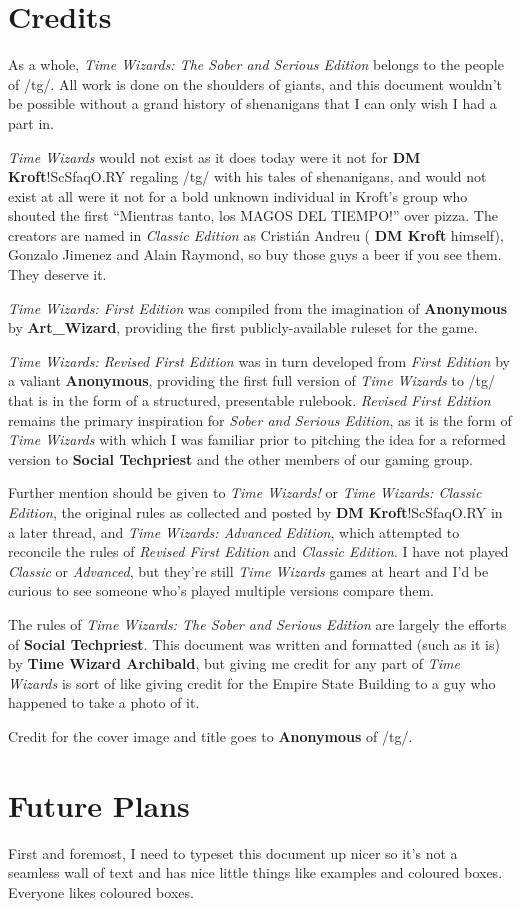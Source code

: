 \documentclass{article}
\newcommand{\twsse}{\emph{Time Wizards: The Sober and Serious Edition}}
\newcommand{\tw}{\emph{Time Wizards}}
\newcommand{\sse}{\emph{Sober and Serious Edition}}
\newcommand{\rfe}{\emph{Revised First Edition}}
\newcommand{\anon}[1][]{{\color{anongreen} \textbf{Anonymous}#1}}
\newcommand{\namefag}[2][]{{\color{anongreen} \textbf{#2}#1}}
\begin{document}
\section{Credits}
As a whole, \twsse{} belongs to the people of /tg/. All work is done on the shoulders of giants,
and this document wouldn't be possible without a grand history of shenanigans that I can only
wish I had a part in.

\tw{} would not exist as it does today were it not for \namefag[!ScSfaqO.RY]{DM Kroft} regaling
/tg/ with his tales of shenanigans, and would not exist at all were it not for a bold unknown
individual in Kroft's group who shouted the first ``Mientras tanto, los MAGOS DEL TIEMPO!'' over
pizza. The creators are named in \emph{Classic Edition} as Cristián Andreu (\namefag{DM Kroft}
himself), Gonzalo Jimenez and Alain Raymond, so buy those guys a beer if you see them. They
deserve it.

\emph{Time Wizards: First Edition} was compiled from the imagination of \anon{} by
\namefag{Art\_Wizard}, providing the first publicly-available ruleset for the game.

\emph{Time Wizards: Revised First Edition} was in turn developed from \emph{First Edition} by a
valiant \anon{}, providing the first full version of \tw{} to /tg/ that is in the form of a
structured, presentable rulebook. \rfe{} remains the primary inspiration for \sse{}, as it is the
form of \tw{} with which I was familiar prior to pitching the idea for a reformed version to
\namefag{Social Techpriest} and the other members of our gaming group.

Further mention should be given to \emph{Time Wizards!} or \emph{Time Wizards: Classic Edition},
the original rules as collected and posted by \namefag[!ScSfaqO.RY]{DM Kroft} in a later thread,
and \emph{Time Wizards: Advanced Edition}, which attempted to reconcile the rules of \rfe{} and
\emph{Classic Edition}. I have not played \emph{Classic} or \emph{Advanced}, but they're still
\tw{} games at heart and I'd be curious to see someone who's played multiple versions compare
them.

The rules of \twsse{} are largely the efforts of \namefag{Social Techpriest}. This document was
written and formatted (such as it is) by \namefag{Time Wizard Archibald}, but giving me credit
for any part of \tw{} is sort of like giving credit for the Empire State Building to a guy who
happened to take a photo of it.

Credit for the cover image and title goes to \anon{} of /tg/.

\section{Future Plans}
First and foremost, I need to typeset this document up nicer so it's not a seamless wall of text
and has nice little things like examples and coloured boxes. Everyone likes coloured boxes.
\end{document}
